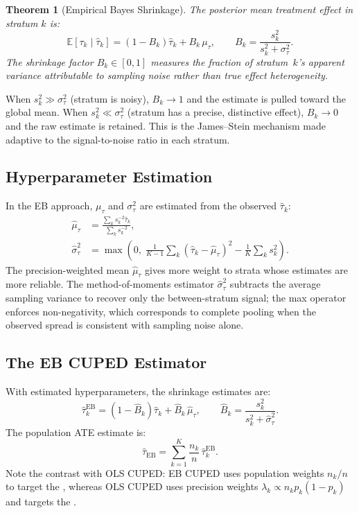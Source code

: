 \documentclass[12pt]{article}
\theoremstyle{plain}
\newtheorem{theorem}{Theorem}
\theoremstyle{definition}
\newcommand{\PATE}{\text{PATE}}
\newcommand{\VWATT}{\text{VWATT}}
\begin{document}
\begin{theorem}[Empirical Bayes Shrinkage]
\label{thm:eb_shrinkage}
The posterior mean treatment effect in stratum $k$ is:
\begin{equation}
  \mathbb{E}[\tau_k \mid \hat{\tau}_k]
    = (1 - B_k)\hat{\tau}_k + B_k\,\mu_\tau,
  \qquad
  B_k = \frac{s_k^2}{s_k^2 + \sigma_\tau^2}.
  \label{eq:shrinkage_eb}
\end{equation}
The shrinkage factor $B_k \in [0,1]$ measures the fraction of stratum~$k$'s
apparent variance attributable to sampling noise rather than true effect
heterogeneity.
\end{theorem}

When $s_k^2 \gg \sigma_\tau^2$ (stratum is noisy), $B_k \to 1$ and the
estimate is pulled toward the global mean.
When $s_k^2 \ll \sigma_\tau^2$ (stratum has a precise, distinctive effect),
$B_k \to 0$ and the raw estimate is retained.
This is the James--Stein mechanism \citep{james1961estimation} made
adaptive to the signal-to-noise ratio in each stratum.

\subsection{Hyperparameter Estimation}

In the EB approach, $\mu_\tau$ and $\sigma_\tau^2$ are estimated from the
observed $\hat{\tau}_k$:
\begin{align}
  \hat{\mu}_\tau &= \frac{\sum_k s_k^{-2}\hat{\tau}_k}
                         {\sum_k s_k^{-2}},
  \label{eq:mu_hat} \\
  \hat{\sigma}_\tau^2 &= \max\!\left(0,\;
    \frac{1}{K-1}\sum_k (\hat{\tau}_k - \hat{\mu}_\tau)^2
    - \frac{1}{K}\sum_k s_k^2\right).
  \label{eq:sigma_hat}
\end{align}
The precision-weighted mean $\hat{\mu}_\tau$ gives more weight to strata
whose estimates are more reliable.
The method-of-moments estimator $\hat{\sigma}_\tau^2$ subtracts the average
sampling variance to recover only the between-stratum signal; the max operator
enforces non-negativity, which corresponds to complete pooling when the
observed spread is consistent with sampling noise alone.

\subsection{The EB CUPED Estimator}

With estimated hyperparameters, the shrinkage estimates are:
\begin{equation}
  \hat{\tau}_k^{\text{EB}} =
    (1 - \hat{B}_k)\hat{\tau}_k + \hat{B}_k\,\hat{\mu}_\tau,
  \qquad
  \hat{B}_k = \frac{s_k^2}{s_k^2 + \hat{\sigma}_\tau^2}.
  \label{eq:eb_estimates}
\end{equation}
The population ATE estimate is:
\begin{equation}
  \hat{\tau}_{\text{EB}} = \sum_{k=1}^K \frac{n_k}{n}\,
    \hat{\tau}_k^{\text{EB}}.
  \label{eq:eb_pop}
\end{equation}
Note the contrast with OLS CUPED: EB CUPED uses population weights $n_k/n$
to target the \PATE, whereas OLS CUPED uses precision weights $\lambda_k
\propto n_k p_k(1-p_k)$ and targets the \VWATT.
\end{document}
